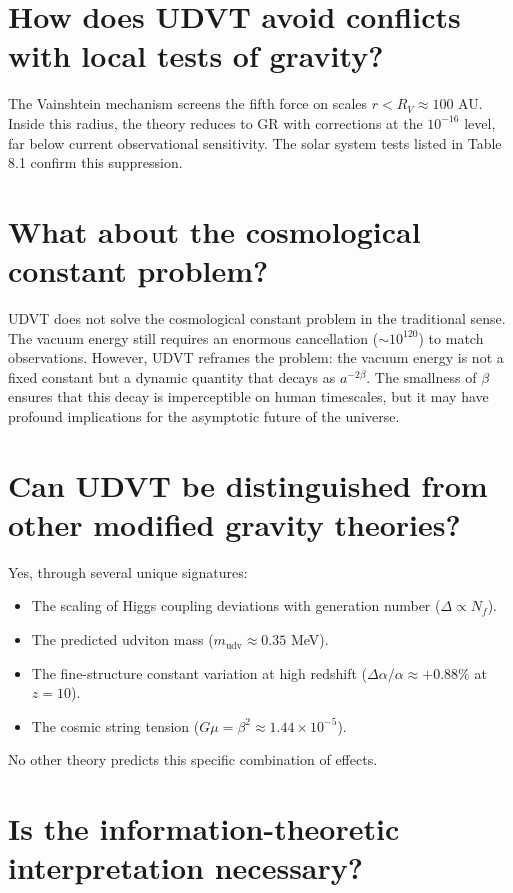 \documentclass[12pt,a4paper]{book}
\theoremstyle{definition}
\theoremstyle{remark}
\begin{document}
\section{How does UDVT avoid conflicts with local tests of gravity?}

The Vainshtein mechanism screens the fifth force on scales $r < R_V \approx 100$ AU. Inside this radius, the theory reduces to GR with corrections at the $10^{-16}$ level, far below current observational sensitivity. The solar system tests listed in Table 8.1 confirm this suppression.

\section{What about the cosmological constant problem?}

UDVT does not solve the cosmological constant problem in the traditional sense. The vacuum energy still requires an enormous cancellation ($\sim 10^{120}$) to match observations. However, UDVT reframes the problem: the vacuum energy is not a fixed constant but a dynamic quantity that decays as $a^{-2\beta}$. The smallness of $\beta$ ensures that this decay is imperceptible on human timescales, but it may have profound implications for the asymptotic future of the universe.

\section{Can UDVT be distinguished from other modified gravity theories?}

Yes, through several unique signatures:
\begin{itemize}
    \item The scaling of Higgs coupling deviations with generation number ($\Delta \propto N_f$).
    \item The predicted udviton mass ($m_{\mathrm{udv}} \approx 0.35$ MeV).
    \item The fine-structure constant variation at high redshift ($\Delta\alpha/\alpha \approx +0.88\%$ at $z = 10$).
    \item The cosmic string tension ($G\mu = \beta^2 \approx 1.44 \times 10^{-5}$).
\end{itemize}
No other theory predicts this specific combination of effects.

\section{Is the information-theoretic interpretation necessary?}
\end{document}
